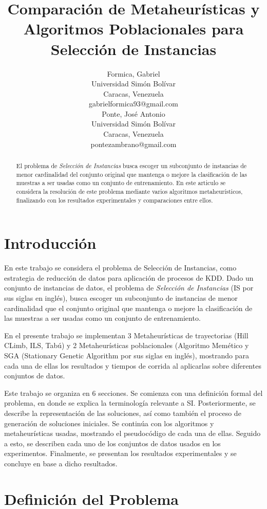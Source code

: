 \documentclass[11pt]{article}
\title{Comparación de Metaheurísticas y Algoritmos Poblacionales
       para Selección de Instancias}
\author{Formica, Gabriel\\
  Universidad Simón Bolívar\\
  Caracas, Venezuela\\
  {gabrielformica93@gmail.com} \\\And
  Ponte, José Antonio\\
  Universidad Simón Bolívar\\
  Caracas, Venezuela\\
  {pontezambrano@gmail.com} \\}
\date{}
\begin{document}
\maketitle
\section{Introducción}
  En este trabajo se considera el problema de Selección de Instancias, como
  estrategia de reducción de datos para aplicación de procesos de KDD. Dado un conjunto de
  instancias de datos, el problema de 
  \textit{Selección de Instancias} (IS por sus siglas en inglés), busca
  escoger un subconjunto de instancias de menor cardinalidad que el conjunto original
  que mantenga o mejore la clasificación de las muestras a ser usadas como un conjunto
  de entrenamiento. 
  
  En el presente trabajo se implementan 3 Metaheurísticas de trayectorias 
  (Hill CLimb, ILS, Tabú) y 2 Metaheurísticas poblacionales (Algoritmo Memético y 
  SGA (Stationary Genetic Algorithm por sus siglas en inglés), 
  mostrando para cada una de ellas los resultados 
  y tiempos de corrida al aplicarlas sobre diferentes conjuntos de datos.

  Este trabajo se organiza en 6 secciones. Se comienza con una definición
  formal del problema, en donde se explica la terminología relevante a SI. 
  Posteriormente, se describe la representación de las soluciones, así 
  como también el proceso de generación de soluciones iniciales. Se continúa
  con los algoritmos y metaheurísticas usadas, mostrando el pseudocódigo de cada
  una de ellas. Seguido a esto, se describen cada uno de los conjuntos de datos usados
  en los experimentos. Finalmente, se presentan los resultados experimentales y se 
  concluye en base a dicho resultados.

\begin{abstract}
  El problema de \textit{Selección de Instancias}  busca
  escoger un subconjunto de instancias de menor cardinalidad del conjunto original
  que mantenga o mejore la clasificación de las muestras a ser usadas como un conjunto
  de entrenamiento. En este articulo se considera la resolución de este problema
  mediante varios algoritmos metaheurísticos, finalizando con los resultados 
  experimentales y comparaciones entre ellos.
\end{abstract}

\section{Definición del Problema}
\end{document}
